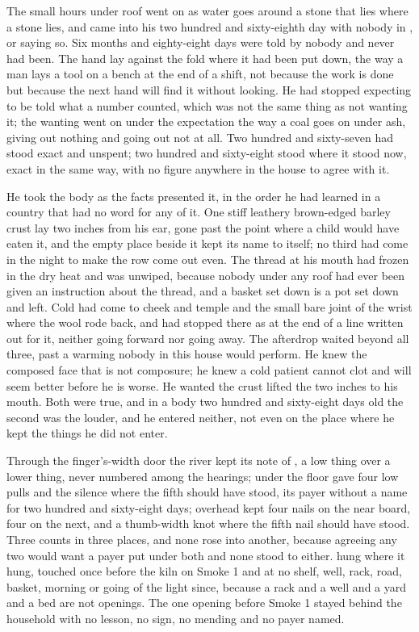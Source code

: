 
The small hours under  roof went on as water goes around a stone that lies where a stone lies, and  came into his two hundred and sixty-eighth day with nobody in ,  or  saying so. Six months and eighty-eight days were told by nobody and never had been. The hand lay against the fold where it had been put down, the way a man lays a tool on a bench at the end of a shift, not because the work is done but because the next hand will find it without looking. He had stopped expecting to be told what a number counted, which was not the same thing as not wanting it; the wanting went on under the expectation the way a coal goes on under ash, giving out nothing and going out not at all. Two hundred and sixty-seven had stood exact and unspent; two hundred and sixty-eight stood where it stood now, exact in the same way, with no figure anywhere in the house to agree with it.

He took the body as the facts presented it, in the order he had learned in a country that had no word for any of it. One stiff leathery brown-edged barley crust lay two inches from his ear, gone past the point where a child would have eaten it, and the empty place beside it kept its name to itself; no third had come in the night to make the row come out even. The thread at his mouth had frozen in the dry heat and was unwiped, because nobody under any roof had ever been given an instruction about the thread, and a basket set down is a pot set down and left. Cold had come to cheek and temple and the small bare joint of the wrist where the wool rode back, and had stopped there as at the end of a line written out for it, neither going forward nor going away. The afterdrop waited beyond all three, past a warming nobody in this house would perform. He knew the composed face that is not composure; he knew a cold patient cannot clot and will seem better before he is worse. He wanted the crust lifted the two inches to his mouth. Both were true, and in a body two hundred and sixty-eight days old the second was the louder, and he entered neither, not even on the place where he kept the things he did not enter.

Through the finger's-width door the river kept its note of , a low thing over a lower thing, never numbered among the hearings; under the floor  gave four low pulls and the silence where the fifth should have stood, its payer without a name for two hundred and sixty-eight days; overhead  kept four nails on the near board, four on the next, and a thumb-width knot where the fifth nail should have stood. Three counts in three places, and none rose into another, because agreeing any two would want a payer put under both and none stood to either.  hung where it hung, touched once before the kiln on Smoke 1 and at no shelf, well, rack, road, basket, morning or going of the light since, because a rack and a well and a yard and a bed are not openings. The one opening before Smoke 1 stayed behind the household with no lesson, no sign, no mending and no payer named.

